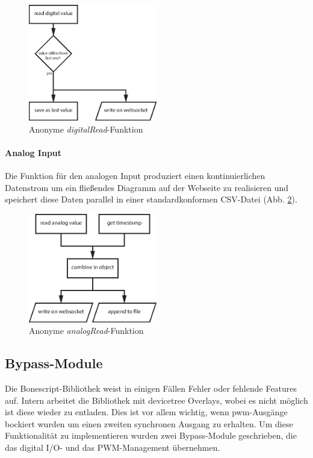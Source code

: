 \begin{figure}[H]
  \centering
  \includegraphics[width = 0.5\textwidth]{documentation/images/wssTimerDigital.eps}
  \caption{Anonyme \textit{digitalRead}-Funktion}
  \label{fig:wssTimerDigital}
\end{figure}

\paragraph{Analog Input} Die Funktion für den analogen Input produziert einen kontinuierlichen Datenstrom um ein fließendes Diagramm auf der Webseite zu realisieren und speichert diese Daten parallel in einer standardkonformen CSV-Datei \cite{rfc4180} (Abb. \ref{fig:wssTimerAnalog}).

\begin{figure}[H]
  \centering
  \includegraphics[width = 0.5\textwidth]{documentation/images/wssTimerAnalog.eps}
  \caption{Anonyme \textit{analogRead}-Funktion}
  \label{fig:wssTimerAnalog}
\end{figure}

\subsection{Bypass-Module}
Die Bonescript-Bibliothek weist in einigen Fällen Fehler oder fehlende Features auf. Intern arbeitet die Bibliothek mit \gls{devicetree} Overlays, wobei es nicht möglich ist diese wieder zu entladen. Dies ist vor allem wichtig, wenn \gls{pwm}-Ausgänge bockiert wurden um einen zweiten synchronen Ausgang zu erhalten. Um diese Funktionalität zu implementieren wurden zwei Bypass-Module geschrieben, die das digital I/O- und das PWM-Management übernehmen.

